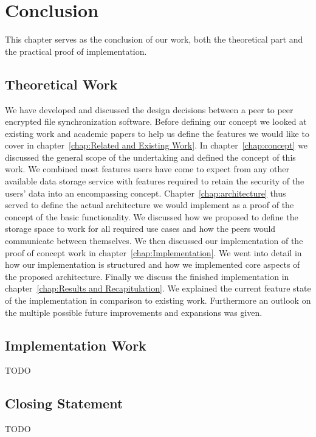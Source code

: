 \chapter{Conclusion}
\label{chap:conclusion}

This chapter serves as the conclusion of our work, both the theoretical part and the practical proof of implementation.

\section{Theoretical Work}
\label{sec:Theoretical Work}

We have developed and discussed the design decisions between a peer to peer encrypted file synchronization software.
Before defining our concept we looked at existing work and academic papers to help us define the features we would like to cover in chapter~\ref{chap:Related and Existing Work}.
In chapter~\ref{chap:concept} we discussed the general scope of the undertaking and defined the concept of this work.
We combined most features users have come to expect from any other available data storage service with features required to retain the security of the users' data into an encompassing concept.
Chapter~\ref{chap:architecture} thus served to define the actual architecture we would implement as a proof of the concept of the basic functionality.
We discussed how we proposed to define the storage space to work for all required use cases and how the peers would communicate between themselves.
We then discussed our implementation of the proof of concept work in chapter~\ref{chap:Implementation}.
We went into detail in how our implementation is structured and how we implemented core aspects of the proposed architecture.
Finally we discuss the finished implementation in chapter~\ref{chap:Results and Recapitulation}.
We explained the current feature state of the implementation in comparison to existing work.
Furthermore an outlook on the multiple possible future improvements and expansions was given.

\section{Implementation Work}
\label{sec:Implementation Work}

TODO

\section{Closing Statement}
\label{sec:Closing Statement}

TODO

